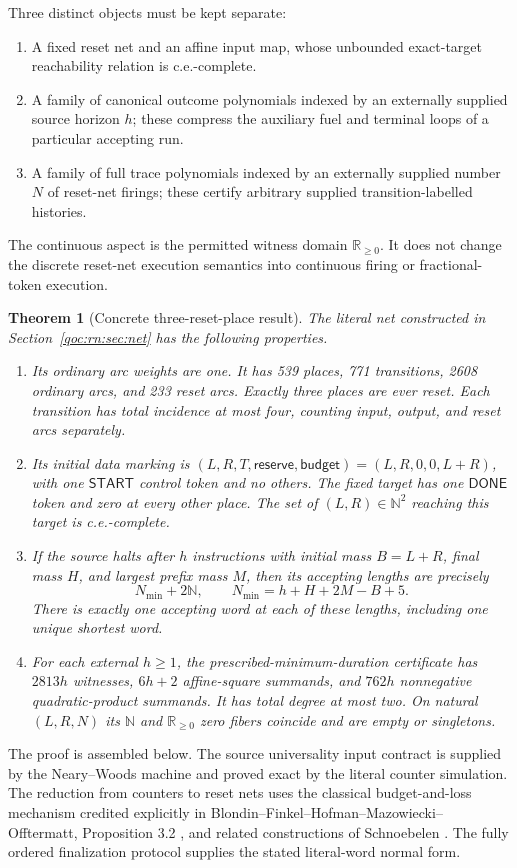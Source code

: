 \documentclass[11pt,letterpaper]{article}
\newtheorem{theorem}{Theorem}[section]
\theoremstyle{definition}
\theoremstyle{remark}
\newcommand{\N}{\mathbb N}
\newcommand{\Rp}{\mathbb R_{\geq0}}
\newcommand{\DONE}{\mathsf{DONE}}
\newcommand{\START}{\mathsf{START}}
\newcommand{\res}{\mathsf{reserve}}
\newcommand{\bud}{\mathsf{budget}}
\begin{document}
Three distinct objects must be kept separate:
\begin{enumerate}
\item A fixed reset net and an affine input map, whose unbounded exact-target reachability relation is c.e.-complete.
\item A family of canonical outcome polynomials indexed by an externally supplied source horizon $h$; these compress the auxiliary fuel and terminal loops of a particular accepting run.
\item A family of full trace polynomials indexed by an externally supplied number $N$ of reset-net firings; these certify arbitrary supplied transition-labelled histories.
\end{enumerate}
The continuous aspect is the permitted witness domain $\Rp$. It does not change the discrete reset-net execution semantics into continuous firing or fractional-token execution.

\begin{theorem}[Concrete three-reset-place result]
\label{qoc:rn:thm:main}
The literal net constructed in Section~\ref{qoc:rn:sec:net} has the following properties.
\begin{enumerate}
\item Its ordinary arc weights are one. It has 539 places, 771 transitions, 2608 ordinary arcs, and 233 reset arcs. Exactly three places are ever reset. Each transition has total incidence at most four, counting input, output, and reset arcs separately.
\item Its initial data marking is $(L,R,T,\res,\bud)=(L,R,0,0,L+R)$, with one $\START$ control token and no others. The fixed target has one $\DONE$ token and zero at \emph{every} other place. The set of $(L,R)\in\N^2$ reaching this target is c.e.-complete.
\item If the source halts after $h$ instructions with initial mass $B=L+R$, final mass $H$, and largest prefix mass $M$, then its accepting lengths are precisely
\[
 N_{\min}+2\N,\qquad N_{\min}=h+H+2M-B+5.
\]
There is exactly one accepting word at each of these lengths, including one unique shortest word.
\item For each external $h\geq1$, the prescribed-minimum-duration certificate has $2813h$ witnesses, $6h+2$ affine-square summands, and $762h$ nonnegative quadratic-product summands. It has total degree at most two. On natural $(L,R,N)$ its $\N$ and $\Rp$ zero fibers coincide and are empty or singletons.
\end{enumerate}
\end{theorem}
The proof is assembled below. The source universality input contract is supplied by the Neary--Woods machine and proved exact by the literal counter simulation. The reduction from counters to reset nets uses the classical budget-and-loss mechanism credited explicitly in Blondin--Finkel--Hofman--Mazowiecki--Offtermatt, Proposition 3.2 \cite{rn:bfhmo}, and related constructions of Schnoebelen \cite{rn:schnoebelen}. The fully ordered finalization protocol supplies the stated literal-word normal form.
\end{document}
